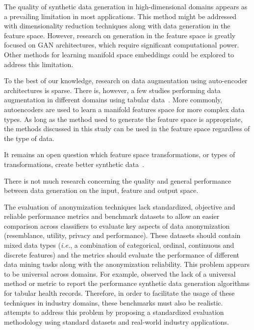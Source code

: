 \documentclass[parskip=full]{scrartcl}
\begin{document}
The quality of synthetic data generation in high-dimensional domains appears
as a prevailing limitation in most applications. This method might be
addressed with dimensionality reduction techniques along with data generation
in the feature space. However, research on generation in the feature space is
greatly focused on GAN architectures, which require significant computational
power. Other methods for learning manifold space embeddings could be explored
to address this limitation.

To the best of our knowledge, research on data augmentation using auto-encoder
architectures is sparse. There is, however, a few studies performing data
augmentation in different domains using tabular data~\cite{delgado2021deep}.
More commonly, autoencoders are used to learn a manifold features space for
more complex data types. As long as the method used to generate the feature
space is appropriate, the methods discussed in this study can be used in the
feature space regardless of the type of data.

It remains an open question which feature space transformations, or types of
transformations, create better synthetic data~\cite{cheung2020modals}.


There is not much research concerning the quality and general performance
between data generation on the input, feature and output space.

The evaluation of anonymization techniques lack standardized, objective and
reliable performance metrics and benchmark datasets to allow an easier
comparison across classifiers to evaluate key aspects of data anonymization
(resemblance, utility, privacy and performance). These datasets should contain
mixed data types (\textit{i.e.}, a combination of categorical, ordinal,
continuous and discrete features) and the metrics should evaluate the
performance of different data mining tasks along with the anonymization
reliability. This problem appears to be universal across domains. For example,
\citet{hernandez2022synthetic} observed the lack of a universal method or
metric to report the performance synthetic data generation algorithms for
tabular health records. Therefore, in order to facilitate the usage of these
techniques in industry domains, these benchmarks must also be
realistic. \citet{rosenblatt2020differentially} attempts to address this
problem by proposing a standardized evaluation methodology using standard
datasets and real-world industry applications.
\end{document}

